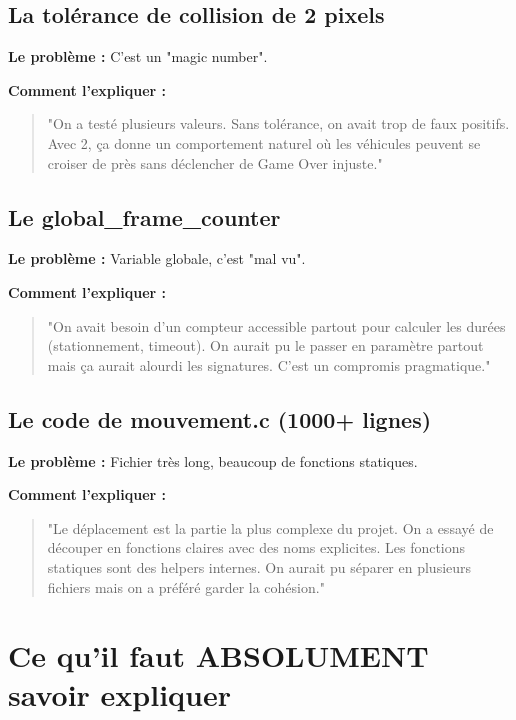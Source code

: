 \documentclass[11pt,a4paper]{article}
\begin{document}
\subsection{La tolérance de collision de 2 pixels}

\textbf{Le problème :} C'est un "magic number".

\textbf{Comment l'expliquer :}
\begin{quote}
"On a testé plusieurs valeurs. Sans tolérance, on avait trop de faux positifs. Avec 2, ça donne un comportement naturel où les véhicules peuvent se croiser de près sans déclencher de Game Over injuste."
\end{quote}

\subsection{Le global\_frame\_counter}

\textbf{Le problème :} Variable globale, c'est "mal vu".

\textbf{Comment l'expliquer :}
\begin{quote}
"On avait besoin d'un compteur accessible partout pour calculer les durées (stationnement, timeout). On aurait pu le passer en paramètre partout mais ça aurait alourdi les signatures. C'est un compromis pragmatique."
\end{quote}

\subsection{Le code de mouvement.c (1000+ lignes)}

\textbf{Le problème :} Fichier très long, beaucoup de fonctions statiques.

\textbf{Comment l'expliquer :}
\begin{quote}
"Le déplacement est la partie la plus complexe du projet. On a essayé de découper en fonctions claires avec des noms explicites. Les fonctions statiques sont des helpers internes. On aurait pu séparer en plusieurs fichiers mais on a préféré garder la cohésion."
\end{quote}

\section{Ce qu'il faut ABSOLUMENT savoir expliquer}
\end{document}

